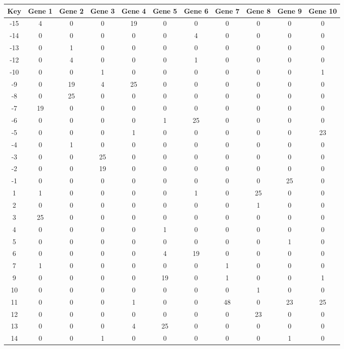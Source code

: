 \begin{tabular}{|c|c|c|c|c|c|c|c|c|c|c|}
\hline
Key & Gene 1 & Gene 2 & Gene 3 & Gene 4 & Gene 5 & Gene 6 & Gene 7 & Gene 8 & Gene 9 & Gene 10 \\
\hline
-15 & 4 & 0 & 0 & 19 & 0 & 0 & 0 & 0 & 0 & 0 \\
-14 & 0 & 0 & 0 & 0 & 0 & 4 & 0 & 0 & 0 & 0 \\
-13 & 0 & 1 & 0 & 0 & 0 & 0 & 0 & 0 & 0 & 0 \\
-12 & 0 & 4 & 0 & 0 & 0 & 1 & 0 & 0 & 0 & 0 \\
-10 & 0 & 0 & 1 & 0 & 0 & 0 & 0 & 0 & 0 & 1 \\
-9 & 0 & 19 & 4 & 25 & 0 & 0 & 0 & 0 & 0 & 0 \\
-8 & 0 & 25 & 0 & 0 & 0 & 0 & 0 & 0 & 0 & 0 \\
-7 & 19 & 0 & 0 & 0 & 0 & 0 & 0 & 0 & 0 & 0 \\
-6 & 0 & 0 & 0 & 0 & 1 & 25 & 0 & 0 & 0 & 0 \\
-5 & 0 & 0 & 0 & 1 & 0 & 0 & 0 & 0 & 0 & 23 \\
-4 & 0 & 1 & 0 & 0 & 0 & 0 & 0 & 0 & 0 & 0 \\
-3 & 0 & 0 & 25 & 0 & 0 & 0 & 0 & 0 & 0 & 0 \\
-2 & 0 & 0 & 19 & 0 & 0 & 0 & 0 & 0 & 0 & 0 \\
-1 & 0 & 0 & 0 & 0 & 0 & 0 & 0 & 0 & 25 & 0 \\
1 & 1 & 0 & 0 & 0 & 0 & 1 & 0 & 25 & 0 & 0 \\
2 & 0 & 0 & 0 & 0 & 0 & 0 & 0 & 1 & 0 & 0 \\
3 & 25 & 0 & 0 & 0 & 0 & 0 & 0 & 0 & 0 & 0 \\
4 & 0 & 0 & 0 & 0 & 1 & 0 & 0 & 0 & 0 & 0 \\
5 & 0 & 0 & 0 & 0 & 0 & 0 & 0 & 0 & 1 & 0 \\
6 & 0 & 0 & 0 & 0 & 4 & 19 & 0 & 0 & 0 & 0 \\
7 & 1 & 0 & 0 & 0 & 0 & 0 & 1 & 0 & 0 & 0 \\
9 & 0 & 0 & 0 & 0 & 19 & 0 & 1 & 0 & 0 & 1 \\
10 & 0 & 0 & 0 & 0 & 0 & 0 & 0 & 1 & 0 & 0 \\
11 & 0 & 0 & 0 & 1 & 0 & 0 & 48 & 0 & 23 & 25 \\
12 & 0 & 0 & 0 & 0 & 0 & 0 & 0 & 23 & 0 & 0 \\
13 & 0 & 0 & 0 & 4 & 25 & 0 & 0 & 0 & 0 & 0 \\
14 & 0 & 0 & 1 & 0 & 0 & 0 & 0 & 0 & 1 & 0 \\
\hline
\end{tabular}